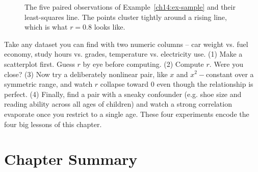 \begin{figure}[H]
\centering
{}
\caption{The five paired observations of Example~\ref{ch14:ex-sample} and their
least-squares line. The points cluster tightly around a rising line, which is what
$r = 0.8$ looks like.}
\label{ch14:fig-sample}
\end{figure}

\begin{labbox}
Take any dataset you can find with two numeric columns -- car weight vs. fuel
economy, study hours vs. grades, temperature vs. electricity use. (1) Make a
scatterplot first. Guess $r$ by eye before computing. (2) Compute $r$. Were you
close? (3) Now try a deliberately nonlinear pair, like $x$ and $x^2 - $constant over
a symmetric range, and watch $r$ collapse toward $0$ even though the relationship is
perfect. (4) Finally, find a pair with a sneaky confounder (e.g. shoe size and
reading ability across all ages of children) and watch a strong correlation
evaporate once you restrict to a single age. These four experiments encode the four
big lessons of this chapter.
\end{labbox}

\section{Chapter Summary}
\label{ch14:summary}

